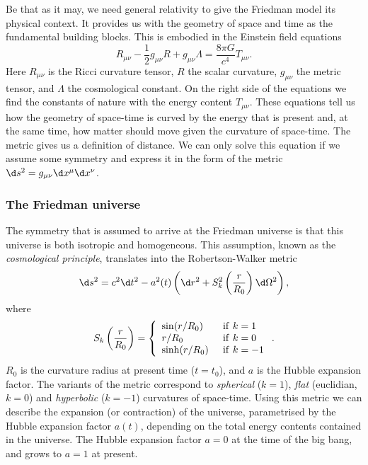 Be that as it may, we need general relativity to give the Friedman model its physical context. It provides us with the geometry of space and time as the fundamental building blocks. This is embodied in the Einstein field equations
\[R_{\mu \nu} - \frac{1}{2} g_{\mu \nu} R + g_{\mu \nu} \Lambda = \frac{8 \pi G}{c^4} T_{\mu \nu}.\]
Here $R_{\mu \nu}$ is the Ricci curvature tensor, $R$ the scalar curvature, $g_{\mu\nu}$ the metric tensor, and $\Lambda$ the cosmological constant. On the right side of the equations we find the constants of nature with the energy content $T_{\mu\nu}$.
These equations tell us how the geometry of space-time is curved by the energy that is present and, at the same time, how matter should move given the curvature of space-time.  The metric gives us a definition of distance. We can only solve this equation if we assume some symmetry and express it in the form of the metric $\d s^2 = g_{\mu\nu}\d x^{\mu}\d x^{\nu}$.

\subsubsection{The Friedman universe}
The symmetry that is assumed to arrive at the Friedman universe is that this universe is both isotropic and homogeneous. This assumption, known as the \emph{cosmological principle}, translates into the Robertson-Walker metric
\[\d s^2 = c^2 \d t^2 - a^2(t) \left(\d r^2 + S_k^2\left(\frac{r}{R_0}\right) \d \Omega^2\right),\]
where
\begin{equation}S_k\left(\frac{r}{R_0}\right) =
    \left\{ \begin{array}{ll} %
    \sin(r/R_0)\quad & {\rm if}\ k = 1 \\
    r/R_0 & {\rm if}\ k = 0 \\
    \sinh(r/R_0) & {\rm if}\ k = -1 \\
    \end{array} \right. .
\end{equation}
$R_0$ is the curvature radius at present time ($t = t_0$), and $a$ is the Hubble expansion factor. The variants of the metric correspond to \emph{spherical} ($k = 1$), \emph{flat} (euclidian, $k = 0$) and \emph{hyperbolic} ($k = -1$) curvatures of space-time.  Using this metric we can describe the expansion (or contraction) of the universe, parametrised by the Hubble expansion factor $a(t)$, depending on the total energy contents contained in the universe. The Hubble expansion factor $a = 0$ at the time of the big bang, and grows to $a = 1$ at present.

